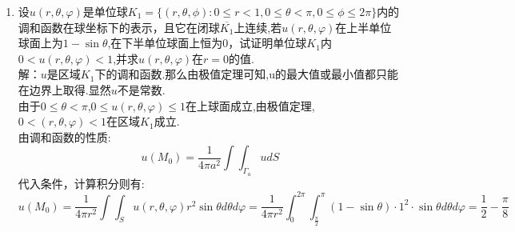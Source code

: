 \documentclass[11pt]{article}
\begin{document}
\begin{enumerate}
    \item 设$u(r,\theta,\varphi)$是单位球$K_1=\{(r,\theta,\phi):0\leq r <1, 0\leq \theta<\pi,0\leq\phi\leq 2\pi\}$内的调和函数在球坐标下的表示，且它在闭球$\overline{K_1}$上连续,若$u(r,\theta,\varphi)$在上半单位球面上为$1-\sin\theta$,在下半单位球面上恒为0，试证明单位球$K_1$内$0<u(r,\theta,\varphi)<1$,并求$u(r,\theta,\varphi)$在$r=0$的值.\\
        解：$u$是区域$K_1$下的调和函数.那么由极值定理可知,u的最大值或最小值都只能在边界上取得.显然$u$不是常数.\\
        由于$0\leq \theta<\pi$,$0\leq u(r,\theta,\varphi)\leq 1$在上球面成立,由极值定理,$0<(r,\theta,\varphi)<1$在区域$K_1$成立.\\
        由调和函数的性质:\[
       u(M_0)=\dfrac{1}{4\pi a^2}\displaystyle\int\int_{\Gamma_a}udS
    \]
        代入条件，计算积分则有:
    \[u(M_0) = \dfrac{1}{4\pi r^2}\int\int_S u(r,\theta,\varphi) r^2 \sin\theta d\theta d\varphi = \dfrac{1}{4\pi r^2}\int_0^{2\pi} \int_{\frac{\pi}{2}}^{\pi} (1 - \sin\theta) \cdot 1^2 \cdot \sin\theta d\theta d\varphi =  \dfrac{1}{2}-\dfrac{\pi}{8}
\]
    \end{enumerate}

    \setlength{\topmargin}{-18mm}
\end{document}
